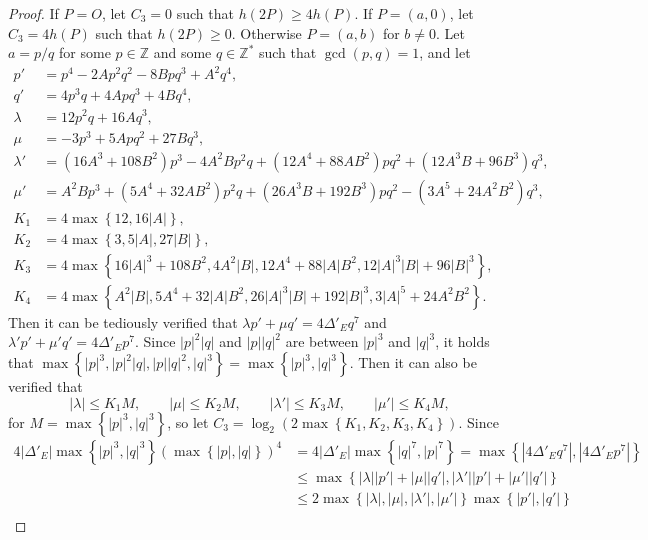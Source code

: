 \documentclass{article}
\newcommand{\Z}{\mathbb{Z}}
\newcommand{\rb}[1]{\left( #1 \right)}
\newcommand{\cb}[1]{\left\{ #1 \right\}}
\newcommand{\abs}[1]{\left\lvert #1 \right\rvert}
\theoremstyle{definition}\newtheorem*{definition}{Definition}
\theoremstyle{definition}\newtheorem*{example}{Example}
\theoremstyle{definition}\newtheorem*{remark}{Remark}
\begin{document}
\begin{proof}
If $ P = O $, let $ C_3 = 0 $ such that $ h\rb{2P} \ge 4h\rb{P} $. If $ P = \rb{a, 0} $, let $ C_3 = 4h\rb{P} $ such that $ h\rb{2P} \ge 0 $. Otherwise $ P = \rb{a, b} $ for $ b \ne 0 $. Let $ a = p / q $ for some $ p \in \Z $ and some $ q \in \Z^* $ such that $ \gcd\rb{p, q} = 1 $, and let
\begin{align*}
p' & = p^4 - 2Ap^2q^2 - 8Bpq^3 + A^2q^4, \\
q' & = 4p^3q + 4Apq^3 + 4Bq^4, \\
\lambda & = 12p^2q + 16Aq^3, \\
\mu & = -3p^3 + 5Apq^2 + 27Bq^3, \\
\lambda' & = \rb{16A^3 + 108B^2}p^3 - 4A^2Bp^2q + \rb{12A^4 + 88AB^2}pq^2 + \rb{12A^3B + 96B^3}q^3, \\
\mu' & = A^2Bp^3 + \rb{5A^4 + 32AB^2}p^2q + \rb{26A^3B + 192B^3}pq^2 - \rb{3A^5 + 24A^2B^2}q^3, \\
K_1 & = 4\max\cb{12, 16\abs{A}}, \\
K_2 & = 4\max\cb{3, 5\abs{A}, 27\abs{B}}, \\
K_3 & = 4\max\cb{16\abs{A}^3 + 108B^2, 4A^2\abs{B}, 12A^4 + 88\abs{A}B^2, 12\abs{A}^3\abs{B} + 96\abs{B}^3}, \\
K_4 & = 4\max\cb{A^2\abs{B}, 5A^4 + 32\abs{A}B^2, 26\abs{A}^3\abs{B} + 192\abs{B}^3, 3\abs{A}^5 + 24A^2B^2}.
\end{align*}
Then it can be tediously verified that $ \lambda p' + \mu q' = 4\Delta'_E q^7 $ and $ \lambda' p' + \mu' q' = 4\Delta'_E p^7 $. Since $ \abs{p}^2\abs{q} $ and $ \abs{p}\abs{q}^2 $ are between $ \abs{p}^3 $ and $ \abs{q}^3 $, it holds that $ \max\cb{\abs{p}^3, \abs{p}^2\abs{q}, \abs{p}\abs{q}^2, \abs{q}^3} = \max\cb{\abs{p}^3, \abs{q}^3} $. Then it can also be verified that
$$ \abs{\lambda} \le K_1M, \qquad \abs{\mu} \le K_2M, \qquad \abs{\lambda'} \le K_3M, \qquad \abs{\mu'} \le K_4M, $$
for $ M = \max\cb{\abs{p}^3, \abs{q}^3} $, so let $ C_3 = \log_2\rb{2\max\cb{K_1, K_2, K_3, K_4}} $. Since
\begin{align*}
4\abs{\Delta'_E}\max\cb{\abs{p}^3, \abs{q}^3}\rb{\max\cb{\abs{p}, \abs{q}}}^4
& = 4\abs{\Delta'_E}\max\cb{\abs{q}^7, \abs{p}^7}
= \max\cb{\abs{4\Delta'_E q^7}, \abs{4\Delta'_E p^7}} \\
& \le \max\cb{\abs{\lambda}\abs{p'} + \abs{\mu}\abs{q'}, \abs{\lambda'}\abs{p'} + \abs{\mu'}\abs{q'}} \\
& \le 2\max\cb{\abs{\lambda}, \abs{\mu}, \abs{\lambda'}, \abs{\mu'}}\max\cb{\abs{p'}, \abs{q'}} \\

\end{align*}
\end{proof}
\end{document}
